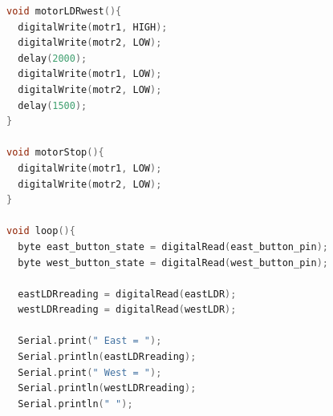 \begin{lstlisting}[language=C++]
void motorLDRwest(){
  digitalWrite(motr1, HIGH); 
  digitalWrite(motr2, LOW); 
  delay(2000); 
  digitalWrite(motr1, LOW); 
  digitalWrite(motr2, LOW); 
  delay(1500);
}

void motorStop(){
  digitalWrite(motr1, LOW); 
  digitalWrite(motr2, LOW);
}

void loop(){
  byte east_button_state = digitalRead(east_button_pin); 
  byte west_button_state = digitalRead(west_button_pin);

  eastLDRreading = digitalRead(eastLDR); 
  westLDRreading = digitalRead(westLDR);

  Serial.print(" East = "); 
  Serial.println(eastLDRreading); 
  Serial.print(" West = "); 
  Serial.println(westLDRreading); 
  Serial.println(" ");
\end{lstlisting}
\clearpage
